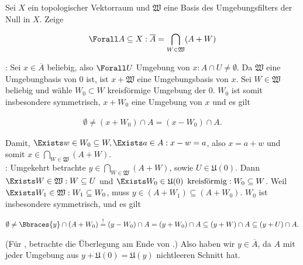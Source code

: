 \begin{exercise}

Sei $X$ ein topologischer Vektorraum und $\mathfrak{W}$ eine Basis des Umgebungsfilters der Null in $X$.
Zeige

\begin{align*}
  \Forall A \subseteq X:
  \overline{A}
  =
  \bigcap_{W \in \mathfrak{W}}(A + W)
\end{align*}

\end{exercise}

\begin{solution}

\Quote{$\subseteq$}:
Sei $x \in \overline{A}$ beliebig, also $\Forall U$ Umgebung von $x: A \cap U \neq \emptyset$.
Da $\mathfrak{W}$ eine Umgebungbasis von $0$ ist, ist $x + \mathfrak{W}$ eine Umgebungsbasis von $x$.
Sei $W \in \mathfrak{W}$ beliebig und wähle $W_0 \subset W$ kreisförmige Umgebung der $0$.
$W_0$ ist somit insbesondere symmetrisch, $x + W_0$ eine Umgebung von $x$ und es gilt

\begin{align*}
  \emptyset
  \neq
  (x + W_0) \cap A
  =
  (x - W_0) \cap A.
\end{align*}

Damit, $\Exists w \in W_0 \subseteq W, \Exists a \in A: x - w = a$, also $x = a + w$ und somit $x \in \bigcap_{W \in \mathfrak{W}}(A + W)$. \\

\Quote{$\supseteq$}:
Umgekehrt betrachte $y \in \bigcap_{W \in \mathfrak{W}}(A + W)$, sowie $ U \in \mathfrak{U}(0)$.
Dann $\Exists W \in \mathfrak{W}: W \subseteq U$ und $\Exists W_0 \in \mathfrak{U}(0) \enspace \text{kreisförmig}: W_0 \subseteq W$.
Weil $\Exists W_1 \in \mathfrak{W}: W_1 \subseteq W_0$, muss $y \in (A + W_1) \subseteq (A + W_0)$.
$W_0$ ist insbesondere symmetrisch, und es gilt

\begin{align*}
  \emptyset
  \neq
  \Bbraces{y} \cap (A + W_0)
  \stackrel{!}{=}
  (y - W_0) \cap A = (y + W_0) \cap A
  \subseteq
  (y + W) \cap A
  \subseteq
  (y + U) \cap A.
\end{align*}

(Für \Quote{!}, betrachte die Überlegung am Ende von \Quote{$\subseteq$}.)
Also haben wir $y \in \overline{A}$, da $A$ mit jeder Umgebung aus $y + \mathfrak{U}(0) = \mathfrak{U}(y)$ nichtleeren Schnitt hat.

\end{solution}
